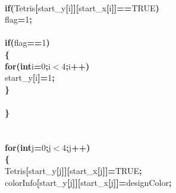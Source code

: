 \documentclass[a4paper, 10pt]{article}
\newcommand\SPC{\hspace*{0.6em}}
\newcommand\HYP{\mbox{\char 45}}
\newcommand{\CppAIdentifier}[1]{#1}
\newcommand{\CppANumber}[1]{\textcolor[rgb]{0.5,0,0.5}{#1}}
\newcommand{\CppAReservedWord}[1]{\textbf{#1}}
\newcommand{\CppASpace}[1]{\colorbox[rgb]{1,1,1}{#1}}
\newcommand{\CppASymbol}[1]{\textbf{\textcolor[rgb]{1,0,0}{#1}}}
\begin{document}
\begin{ttfamily}
\\
\CppASpace{\SPC \SPC \SPC \SPC }\CppAReservedWord{if}\CppASymbol{(}\CppAIdentifier{Tetris}\CppASymbol{[}\CppAIdentifier{start\_y}\CppASymbol{[}\CppAIdentifier{i}\CppASymbol{]}\CppASymbol{]}\CppASymbol{[}\CppAIdentifier{start\_x}\CppASymbol{[}\CppAIdentifier{i}\CppASymbol{]}\CppASymbol{]}\CppASymbol{==}\CppAIdentifier{TRUE}\CppASymbol{)}\\
\CppASpace{\SPC \SPC \SPC \SPC \SPC }\CppAIdentifier{flag}\CppASymbol{=}\CppANumber{1}\CppASymbol{;}\\
\\
\CppASpace{\SPC \SPC \SPC \SPC }\CppAReservedWord{if}\CppASymbol{(}\CppAIdentifier{flag}\CppASymbol{==}\CppANumber{1}\CppASymbol{)}\\
\CppASpace{\SPC \SPC \SPC \SPC }\CppASymbol{\{}\\
\CppASpace{\SPC \SPC \SPC \SPC \SPC }\CppAReservedWord{for}\CppASymbol{(}\CppAReservedWord{int}\CppASpace{\SPC }\CppAIdentifier{i}\CppASymbol{=}\CppANumber{0}\CppASymbol{;}\CppAIdentifier{i}\CppASymbol{$<$}\CppANumber{4}\CppASymbol{;}\CppAIdentifier{i}\CppASymbol{++}\CppASymbol{)}\\
\CppASpace{\SPC \SPC \SPC \SPC \SPC \SPC }\CppAIdentifier{start\_y}\CppASymbol{[}\CppAIdentifier{i}\CppASymbol{]}\CppASymbol{\HYP =}\CppANumber{1}\CppASymbol{;}\\
\CppASpace{\SPC \SPC \SPC \SPC }\CppASymbol{\}}\\
\\
\CppASpace{\SPC \SPC }\CppASymbol{\}}\\
\\
\\
\CppASpace{\SPC \SPC }\CppAReservedWord{for}\CppASymbol{(}\CppAReservedWord{int}\CppASpace{\SPC }\CppAIdentifier{j}\CppASymbol{=}\CppANumber{0}\CppASymbol{;}\CppAIdentifier{j}\CppASymbol{$<$}\CppANumber{4}\CppASymbol{;}\CppAIdentifier{j}\CppASymbol{++}\CppASymbol{)}\\
\CppASpace{\SPC \SPC }\CppASymbol{\{}\\
\CppASpace{\SPC \SPC \SPC }\CppAIdentifier{Tetris}\CppASymbol{[}\CppAIdentifier{start\_y}\CppASymbol{[}\CppAIdentifier{j}\CppASymbol{]}\CppASymbol{]}\CppASymbol{[}\CppAIdentifier{start\_x}\CppASymbol{[}\CppAIdentifier{j}\CppASymbol{]}\CppASymbol{]}\CppASymbol{=}\CppAIdentifier{TRUE}\CppASymbol{;}\\
\CppASpace{\SPC \SPC \SPC }\CppAIdentifier{colorInfo}\CppASymbol{[}\CppAIdentifier{start\_y}\CppASymbol{[}\CppAIdentifier{j}\CppASymbol{]}\CppASymbol{]}\CppASymbol{[}\CppAIdentifier{start\_x}\CppASymbol{[}\CppAIdentifier{j}\CppASymbol{]}\CppASymbol{]}\CppASymbol{=}\CppAIdentifier{designColor}\CppASymbol{;}\\

\end{ttfamily}
\end{document}
